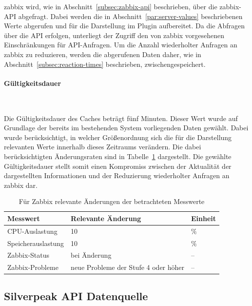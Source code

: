 \label{subsec:zabbix-ds-api}

\gls{zabbix} wird, wie in Abschnitt~\ref{subsec:zabbix-api} beschrieben, über die
\gls{zabbix}-API abgefragt. Dabei werden die in Abschnitt~\ref{par:server-values}
beschriebenen Werte abgerufen und für die Darstellung im Plugin aufbereitet. Da die
Abfragen über die API erfolgen, unterliegt der Zugriff den von \gls{zabbix}
vorgesehenen Einschränkungen für API-Anfragen. Um die Anzahl wiederholter Anfragen
an \gls{zabbix} zu reduzieren, werden die abgerufenen Daten daher, wie in
Abschnitt~\ref{subsec:reaction-times} beschrieben, zwischengespeichert.

\paragraph{Gültigkeitsdauer}
\label{par:zabix-validation-time}

~

Die Gültigkeitsdauer des Caches beträgt fünf Minuten. Dieser Wert wurde auf
Grundlage der bereits im bestehenden System vorliegenden Daten gewählt. Dabei
wurde berücksichtigt, in welcher Größenordnung sich die für die Darstellung
relevanten Werte innerhalb dieses Zeitraums verändern. Die dabei berücksichtigten
Änderungsraten sind in Tabelle~\ref{tab:zabbix-change-rates} dargestellt. Die
gewählte Gültigkeitsdauer stellt somit einen Kompromiss zwischen der Aktualität
der dargestellten Informationen und der Reduzierung wiederholter Anfragen an
\gls{zabbix} dar.

\begin{table}[H]
    \centering
    \begin{tabular}{lll}
        \toprule
        \textbf{Messwert} & \textbf{Relevante Änderung} & \textbf{Einheit} \\
        \midrule
        CPU-Auslastung      & 10 & $\mathrm{\%}$ \\
        Speicherauslastung  & 10 & $\mathrm{\%}$ \\
        Zabbix-Status       & bei Änderung & -- \\
        Zabbix-Probleme     & neue Probleme der Stufe 4 oder höher & -- \\
        \bottomrule
    \end{tabular}
    \caption{Für Zabbix relevante Änderungen der betrachteten Messwerte}
    \label{tab:zabbix-change-rates}
\end{table}

\subsection{Silverpeak API Datenquelle}
\label{subsec:silverpeak-ds-api}

